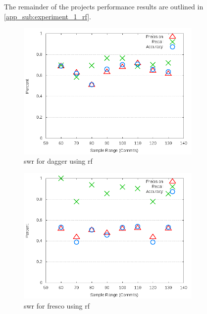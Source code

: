 The remainder of the projects performance results are outlined in \autoref{app_sub:experiment_1_rf}.

\begin{figure}[!ht]
    \centering
        \includegraphics[width=0.8\textwidth]{images/rf/test_1/dagger_sample_range}
        \caption{\gls{swr} for dagger using \gls{rf}}
        \label{fig:test_1_dagger_rf}
\end{figure}


\begin{figure}[!ht]
    \centering

        \includegraphics[width=0.8\textwidth]{images/rf/test_1/fresco_sample_range}
        \caption{\gls{swr} for fresco using \gls{rf}}
        \label{fig:test_1_fresco_rf}
\end{figure}

